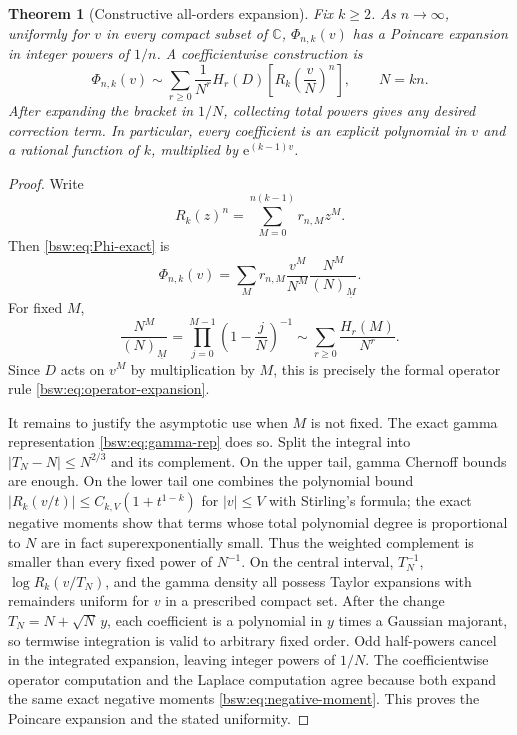 \documentclass[11pt,letterpaper]{article}
\newtheorem{theorem}{Theorem}[section]
\theoremstyle{definition}
\theoremstyle{remark}
\newcommand{\CC}{\mathbb C}
\newcommand{\ee}{\mathrm e}
\newcommand{\fall}[2]{(#1)_{\underline{#2}}}
\begin{document}
\begin{theorem}[Constructive all-orders expansion]\label{bsw:thm:all-orders}
Fix $k\ge2$.  As $n\to\infty$, uniformly for $v$ in every compact subset of
$\CC$, $\Phi_{n,k}(v)$ has a Poincare expansion in integer powers of $1/n$.
A coefficientwise construction is
\begin{equation}\label{bsw:eq:operator-expansion}
 \boxed{\displaystyle
 \Phi_{n,k}(v)\sim
 \sum_{r\ge0}\frac1{N^r}
 H_r(D)\left[R_k\!\left(\frac vN\right)^n\right],
 \qquad N=kn.}
\end{equation}
After expanding the bracket in $1/N$, collecting total powers gives any
desired correction term.  In particular, every coefficient is an explicit
polynomial in $v$ and a rational function of $k$, multiplied by
$\ee^{(k-1)v}$.
\end{theorem}

\begin{proof}
Write
\[
 R_k(z)^n=\sum_{M=0}^{n(k-1)}r_{n,M}z^M.
\]
Then \eqref{bsw:eq:Phi-exact} is
\[
 \Phi_{n,k}(v)=\sum_M r_{n,M}\frac{v^M}{N^M}
 \frac{N^M}{\fall NM}.
\]
For fixed $M$,
\[
 \frac{N^M}{\fall NM}
 =\prod_{j=0}^{M-1}\left(1-\frac jN\right)^{-1}
 \sim\sum_{r\ge0}\frac{H_r(M)}{N^r}.
\]
Since $D$ acts on $v^M$ by multiplication by $M$, this is precisely the
formal operator rule \eqref{bsw:eq:operator-expansion}.

It remains to justify the asymptotic use when $M$ is not fixed.  The exact
gamma representation \eqref{bsw:eq:gamma-rep} does so.  Split the integral into
$|T_N-N|\le N^{2/3}$ and its complement.  On the upper tail, gamma Chernoff
bounds are enough.  On the lower tail one combines the polynomial bound
$|R_k(v/t)|\le C_{k,V}(1+t^{1-k})$ for $|v|\le V$ with Stirling's formula;
the exact negative moments show that terms whose total polynomial degree is
proportional to $N$ are in fact superexponentially small.  Thus the weighted
complement is smaller than every fixed power of $N^{-1}$.  On the central
interval, $T_N^{-1}$, $\log R_k(v/T_N)$, and the gamma density all possess
Taylor expansions with remainders uniform for $v$ in a prescribed compact
set.
After the change $T_N=N+\sqrt N\,y$, each coefficient is a polynomial in $y$
times a Gaussian majorant, so termwise integration is valid to arbitrary
fixed order.  Odd half-powers cancel in the integrated expansion, leaving
integer powers of $1/N$.  The coefficientwise operator computation and the
Laplace computation agree because both expand the same exact negative moments
\eqref{bsw:eq:negative-moment}.  This proves the Poincare expansion and the stated
uniformity.
\end{proof}
\end{document}
